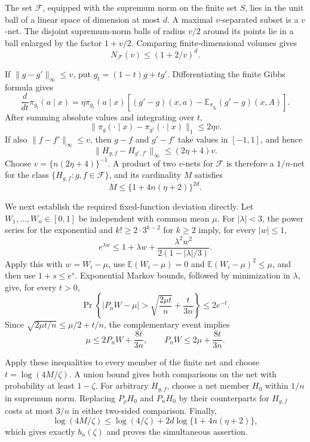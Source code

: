 The set \(\mathcal F\), equipped with the supremum norm on the finite set \(S\), lies in the unit ball of a linear space of dimension at most \(d\). A maximal \(v\)-separated subset is a \(v\)-net. The disjoint supremum-norm balls of radius \(v/2\) around its points lie in a ball enlarged by the factor \(1+v/2\). Comparing finite-dimensional volumes gives
\[
N_{\mathcal F}(v)\le(1+2/v)^d.
\]

If \(\|g-g'\|_\infty\le v\), put \(g_t=(1-t)g+tg'\). Differentiating the finite Gibbs formula gives
\[
\frac{d}{dt}\pi_{g_t}(a\mid x)
=\eta\pi_{g_t}(a\mid x)\left[(g'-g)(x,a)-\mathbb E_{\pi_{g_t}}(g'-g)(x,A)\right].
\]
After summing absolute values and integrating over \(t\),
\[
\|\pi_g(\cdot\mid x)-\pi_{g'}(\cdot\mid x)\|_1\le2\eta v.
\]
If also \(\|f-f'\|_\infty\le v\), then \(g-f\) and \(g'-f'\) take values in \([-1,1]\), and hence
\[
\|H_{g,f}-H_{g',f'}\|_\infty\le(2\eta+4)v.
\]
Choose \(v=\{n(2\eta+4)\}^{-1}\). A product of two \(v\)-nets for \(\mathcal F\) is therefore a \(1/n\)-net for the class \(\{H_{g,f}:g,f\in\mathcal F\}\), and its cardinality \(M\) satisfies
\[
M\le\{1+4n(\eta+2)\}^{2d}.
\]

We next establish the required fixed-function deviation directly. Let \(W_1,\ldots,W_n\in[0,1]\) be independent with common mean \(\mu\). For \(|\lambda|<3\), the power series for the exponential and \(k!\ge2\cdot3^{k-2}\) for \(k\ge2\) imply, for every \(|w|\le1\),
\[
e^{\lambda w}\le1+\lambda w+\frac{\lambda^2w^2}{2(1-|\lambda|/3)}.
\]
Apply this with \(w=W_i-\mu\), use \(\mathbb E(W_i-\mu)=0\) and \(\mathbb E(W_i-\mu)^2\le\mu\), and then use \(1+s\le e^s\). Exponential Markov bounds, followed by minimization in \(\lambda\), give, for every \(t>0\),
\[
\Pr\left\{\left|P_nW-\mu\right|>\sqrt{\frac{2\mu t}{n}}+\frac{t}{3n}\right\}\le2e^{-t}.
\]
Since \(\sqrt{2\mu t/n}\le\mu/2+t/n\), the complementary event implies
\[
\mu\le2P_nW+\frac{8t}{3n},
\qquad
P_nW\le2\mu+\frac{8t}{3n}.
\]

Apply these inequalities to every member of the finite net and choose \(t=\log(4M/\zeta)\). A union bound gives both comparisons on the net with probability at least \(1-\zeta\). For arbitrary \(H_{g,f}\), choose a net member \(H_0\) within \(1/n\) in supremum norm. Replacing \(P_\rho H_0\) and \(P_nH_0\) by their counterparts for \(H_{g,f}\) costs at most \(3/n\) in either two-sided comparison. Finally,
\[
\log(4M/\zeta)
\le\log(4/\zeta)+2d\log\{1+4n(\eta+2)\},
\]
which gives exactly \(b_n(\zeta)\) and proves the simultaneous assertion.